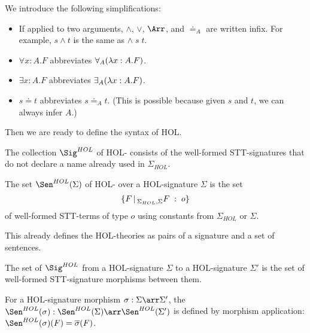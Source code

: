 \begin{notation}
We introduce the following simplifications:
\begin{itemize}
  \item If applied to two arguments, $\wedge$, $\vee$, $\Arr$, and $\doteq_A$ are written infix. For example, $s\wedge t$ is the same as $\wedge\;s\;t$.
	\item $\forall x:A.F$ abbreviates $\forall_A(\lambda x:A.F)$.
	\item $\exists x:A.F$ abbreviates $\exists_A(\lambda x:A.F)$.
	\item $s\doteq t$ abbreviates $s \doteq_A t$. (This is possible because given $s$ and $t$, we can always infer $A$.)
\end{itemize}
\end{notation}

Then we are ready to define the syntax of HOL.

\begin{definition}
The collection $\Sig^{HOL}$ of HOL- consists of the well-formed STT-signatures that do not declare a name already used in $\Sigma_{HOL}$.
\end{definition}

\begin{definition}
The set $\Sen^{HOL}(\Sigma)$ of HOL- over a HOL-signature $\Sigma$ is the set
 \[\{F \,|\, ^{}_{\Sigma_{HOL},\Sigma}F\;:\;o\}\]
of well-formed STT-terms of type $o$ using constants from $\Sigma_{HOL}$ or $\Sigma$.
\end{definition}

This already defines the HOL-theories as pairs of a signature and a set of sentences.

\begin{definition}
The set of $\Sig^{HOL}$  from a HOL-signature $\Sigma$ to a HOL-signature $\Sigma'$ is the set of well-formed STT-signature morphisms between them.
\end{definition}

\begin{definition}
For a HOL-signature morphism $\ismorph{\Sigma}{\Sigma'}{\sigma}$, the  $\Sen^{HOL}(\sigma):\Sen^{HOL}(\Sigma)\arr\Sen^{HOL}(\Sigma')$  is defined by morphism application: $\Sen^{HOL}(\sigma)(F)=\overline{\sigma}(F)$.
\end{definition}

